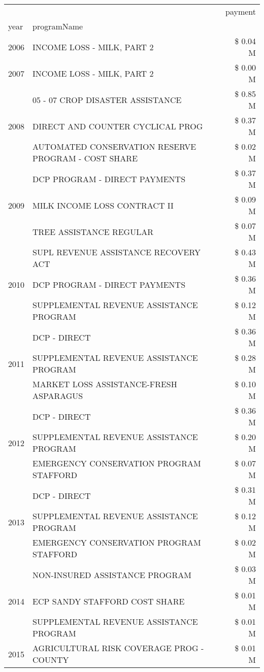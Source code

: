 \begin{tabular}{llr}
\toprule
 &  & payment \\
year & programName &  \\
\midrule
2006 & INCOME LOSS - MILK, PART 2 & \$ 0.04 M \\
\cline{1-3}
2007 & INCOME LOSS - MILK, PART 2 & \$ 0.00 M \\
\cline{1-3}
\multirow[t]{3}{*}{2008} & 05 - 07 CROP DISASTER ASSISTANCE & \$ 0.85 M \\
 & DIRECT AND COUNTER CYCLICAL PROG & \$ 0.37 M \\
 & AUTOMATED CONSERVATION RESERVE PROGRAM - COST SHARE & \$ 0.02 M \\
\cline{1-3}
\multirow[t]{3}{*}{2009} & DCP PROGRAM - DIRECT PAYMENTS & \$ 0.37 M \\
 & MILK INCOME LOSS CONTRACT II & \$ 0.09 M \\
 & TREE ASSISTANCE REGULAR & \$ 0.07 M \\
\cline{1-3}
\multirow[t]{3}{*}{2010} & SUPL REVENUE ASSISTANCE RECOVERY ACT & \$ 0.43 M \\
 & DCP PROGRAM - DIRECT PAYMENTS & \$ 0.36 M \\
 & SUPPLEMENTAL REVENUE ASSISTANCE PROGRAM & \$ 0.12 M \\
\cline{1-3}
\multirow[t]{3}{*}{2011} & DCP - DIRECT & \$ 0.36 M \\
 & SUPPLEMENTAL REVENUE ASSISTANCE PROGRAM & \$ 0.28 M \\
 & MARKET LOSS ASSISTANCE-FRESH ASPARAGUS & \$ 0.10 M \\
\cline{1-3}
\multirow[t]{3}{*}{2012} & DCP - DIRECT & \$ 0.36 M \\
 & SUPPLEMENTAL REVENUE ASSISTANCE PROGRAM & \$ 0.20 M \\
 & EMERGENCY CONSERVATION PROGRAM STAFFORD & \$ 0.07 M \\
\cline{1-3}
\multirow[t]{3}{*}{2013} & DCP - DIRECT & \$ 0.31 M \\
 & SUPPLEMENTAL REVENUE ASSISTANCE PROGRAM & \$ 0.12 M \\
 & EMERGENCY CONSERVATION PROGRAM STAFFORD & \$ 0.02 M \\
\cline{1-3}
\multirow[t]{3}{*}{2014} & NON-INSURED ASSISTANCE PROGRAM & \$ 0.03 M \\
 & ECP SANDY STAFFORD COST SHARE & \$ 0.01 M \\
 & SUPPLEMENTAL REVENUE ASSISTANCE PROGRAM & \$ 0.01 M \\
\cline{1-3}
\multirow[t]{3}{*}{2015} & AGRICULTURAL RISK COVERAGE PROG - COUNTY & \$ 0.01 M \\

\end{tabular}
